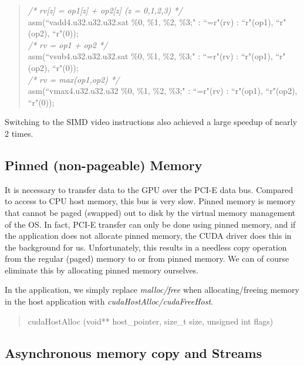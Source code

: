 \begin{quote}
\selectfont
 \textsl{/* rv[z] = op1[z] + op2[z] (z = 0,1,2,3) */}\\
 asm(``vadd4.u32.u32.u32.sat \%0, \%1, \%2, \%3;" : ``=r"(rv) : ``r"(op1), ``r"(op2), ``r"(0));\\
 \textsl{/* rv = op1 + op2 */}\\
 asm(``vsub4.u32.u32.u32.sat \%0, \%1, \%2, \%3;" : ``=r"(rv) : ``r"(op1), ``r"(op2), ``r"(0));\\
 \textsl{/* rv = max(op1,op2) */}\\
 asm(``vmax4.u32.u32.u32 \%0, \%1, \%2, \%3;" : ``=r"(rv) : ``r"(op1), ``r"(op2), ``r"(0));
\end{quote}

Switching to the SIMD video instructions also achieved a large speedup of nearly 2 times.

\subsection{Pinned (non-pageable) Memory}
\label{pin}

It is necessary to transfer data to the GPU over the PCI-E data bus. Compared to access to CPU host memory, this bus is very slow. Pinned memory is memory that cannot be paged (swapped) out to disk by the virtual memory management of the OS. In fact, PCI-E transfer can only be done using pinned memory, and if the application does not allocate pinned memory, the CUDA driver does this in the background for us. Unfortunately, this results in a needless copy operation from the regular (paged) memory to or from pinned memory. We can of course eliminate this by allocating pinned memory ourselves.

In the application, we simply replace \emph{malloc/free} when allocating/freeing memory in the host application with \emph{cudaHostAlloc/cudaFreeHost}.

\begin{quote}
\selectfont
 cudaHostAlloc (void** host\_pointer, size\_t size, unsigned int flags)
\end{quote}

\subsection{Asynchronous memory copy and Streams}
\label{asyn}

